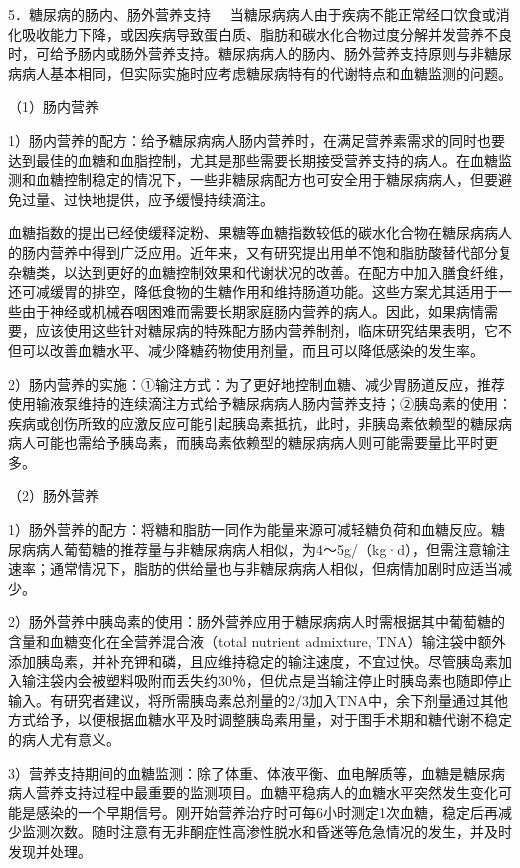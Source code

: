 {5．糖尿病的肠内、肠外营养支持}
　当糖尿病病人由于疾病不能正常经口饮食或消化吸收能力下降，或因疾病导致蛋白质、脂肪和碳水化合物过度分解并发营养不良时，可给予肠内或肠外营养支持。糖尿病病人的肠内、肠外营养支持原则与非糖尿病病人基本相同，但实际实施时应考虑糖尿病特有的代谢特点和血糖监测的问题。

（1）肠内营养

1）肠内营养的配方：给予糖尿病病人肠内营养时，在满足营养素需求的同时也要达到最佳的血糖和血脂控制，尤其是那些需要长期接受营养支持的病人。在血糖监测和血糖控制稳定的情况下，一些非糖尿病配方也可安全用于糖尿病病人，但要避免过量、过快地提供，应予缓慢持续滴注。

血糖指数的提出已经使缓释淀粉、果糖等血糖指数较低的碳水化合物在糖尿病病人的肠内营养中得到广泛应用。近年来，又有研究提出用单不饱和脂肪酸替代部分复杂糖类，以达到更好的血糖控制效果和代谢状况的改善。在配方中加入膳食纤维，还可减缓胃的排空，降低食物的生糖作用和维持肠道功能。这些方案尤其适用于一些由于神经或机械吞咽困难而需要长期家庭肠内营养的病人。因此，如果病情需要，应该使用这些针对糖尿病的特殊配方肠内营养制剂，临床研究结果表明，它不但可以改善血糖水平、减少降糖药物使用剂量，而且可以降低感染的发生率。

2）肠内营养的实施：①输注方式：为了更好地控制血糖、减少胃肠道反应，推荐使用输液泵维持的连续滴注方式给予糖尿病病人肠内营养支持；②胰岛素的使用：疾病或创伤所致的应激反应可能引起胰岛素抵抗，此时，非胰岛素依赖型的糖尿病病人可能也需给予胰岛素，而胰岛素依赖型的糖尿病病人则可能需要量比平时更多。

（2）肠外营养

1）肠外营养的配方：将糖和脂肪一同作为能量来源可减轻糖负荷和血糖反应。糖尿病病人葡萄糖的推荐量与非糖尿病病人相似，为4～5g/（kg·d），但需注意输注速率；通常情况下，脂肪的供给量也与非糖尿病病人相似，但病情加剧时应适当减少。

2）肠外营养中胰岛素的使用：肠外营养应用于糖尿病病人时需根据其中葡萄糖的含量和血糖变化在全营养混合液（total
nutrient admixture,
TNA）输注袋中额外添加胰岛素，并补充钾和磷，且应维持稳定的输注速度，不宜过快。尽管胰岛素加入输注袋内会被塑料吸附而丢失约30％，但优点是当输注停止时胰岛素也随即停止输入。有研究者建议，将所需胰岛素总剂量的2/3加入TNA中，余下剂量通过其他方式给予，以便根据血糖水平及时调整胰岛素用量，对于围手术期和糖代谢不稳定的病人尤有意义。

3）营养支持期间的血糖监测：除了体重、体液平衡、血电解质等，血糖是糖尿病病人营养支持过程中最重要的监测项目。血糖平稳病人的血糖水平突然发生变化可能是感染的一个早期信号。刚开始营养治疗时可每6小时测定1次血糖，稳定后再减少监测次数。随时注意有无非酮症性高渗性脱水和昏迷等危急情况的发生，并及时发现并处理。

